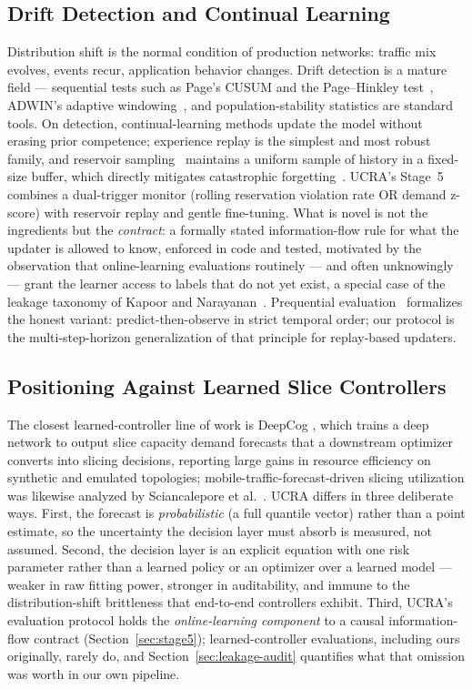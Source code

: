 \subsection{Drift Detection and Continual Learning}

Distribution shift is the normal condition of production networks:
traffic mix evolves, events recur, application behavior changes.
Drift detection is a mature field --- sequential tests such as
Page's CUSUM and the Page--Hinkley test~\cite{page1954continuous},
ADWIN's adaptive windowing~\cite{bifet2007learning}, and
population-stability statistics are standard tools. On detection,
continual-learning methods update the model without erasing prior
competence; experience replay is the simplest and most robust family,
and reservoir sampling~\cite{vitter1985random} maintains a uniform
sample of history in a fixed-size buffer, which directly mitigates
catastrophic forgetting~\cite{chaudhry2019continual,rolnick2019experience}.
UCRA's Stage~5 combines a dual-trigger monitor (rolling reservation
violation rate OR demand z-score) with reservoir replay and gentle
fine-tuning. What is novel is not the ingredients but the
\emph{contract}: a formally stated information-flow rule for what the
updater is allowed to know, enforced in code and tested, motivated by
the observation that online-learning evaluations routinely --- and
often unknowingly --- grant the learner access to labels that do not
yet exist, a special case of the leakage taxonomy of
Kapoor and Narayanan~\cite{kapoor2023leakage}. Prequential
evaluation~\cite{dawid1984present} formalizes the honest variant:
predict-then-observe in strict temporal order; our protocol is the
multi-step-horizon generalization of that principle for replay-based
updaters.

\subsection{Positioning Against Learned Slice Controllers}

The closest learned-controller line of work is DeepCog
\cite{bega2019deepcog}, which trains a deep network to output slice
capacity demand forecasts that a downstream optimizer converts into
slicing decisions, reporting large gains in resource efficiency on
synthetic and emulated topologies; mobile-traffic-forecast-driven
slicing utilization was likewise analyzed by Sciancalepore et
al.~\cite{sciancalepore2017mobile}. UCRA differs in three deliberate
ways. First, the forecast is \emph{probabilistic} (a full quantile
vector) rather than a point estimate, so the uncertainty the decision
layer must absorb is measured, not assumed. Second, the
decision layer is an explicit equation with one risk parameter rather
than a learned policy or an optimizer over a learned model --- weaker
in raw fitting power, stronger in auditability, and immune to the
distribution-shift brittleness that end-to-end controllers exhibit.
Third, UCRA's evaluation protocol holds the \emph{online-learning
component} to a causal information-flow contract
(Section~\ref{sec:stage5}); learned-controller evaluations, including
ours originally, rarely do, and Section~\ref{sec:leakage-audit}
quantifies what that omission was worth in our own pipeline.


